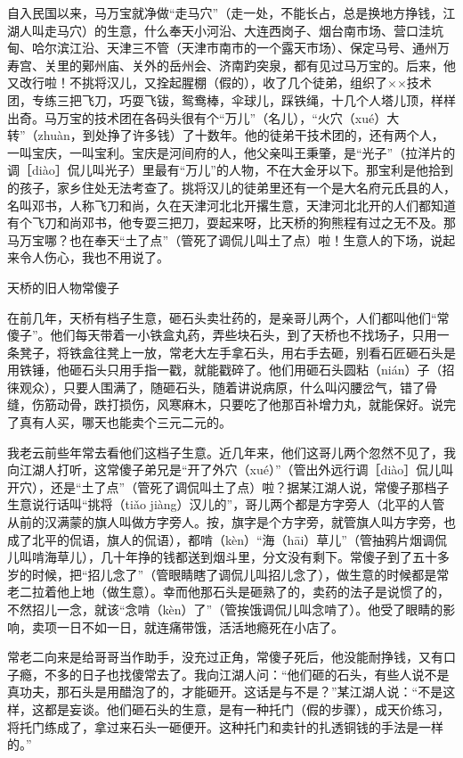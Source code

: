 \documentclass[12pt,UTF8]{ctexbook}
\begin{document}
自入民国以来，马万宝就净做“走马穴”（走一处，不能长占，总是换地方挣钱，江湖人叫走马穴）的生意，什么奉天小河沿、大连西岗子、烟台南市场、营口洼坑甸、哈尔滨江沿、天津三不管（天津市南市的一个露天市场）、保定马号、通州万寿宫、关里的鄚州庙、关外的岳州会、济南趵突泉，都有见过马万宝的。后来，他又改行啦！不挑将汉儿，又拴起腥棚（假的），收了几个徒弟，组织了××技术团，专练三把飞刀，巧耍飞钹，鸳鸯棒，伞球儿，踩铁绳，十几个人塔儿顶，样样出奇。马万宝的技术团在各码头很有个“万儿”（名儿），“火穴（xué）大转”（zhuàn，到处挣了许多钱）了十数年。他的徒弟干技术团的，还有两个人，一叫宝庆，一叫宝利。宝庆是河间府的人，他父亲叫王秉肇，是“光子”（拉洋片的调［diào］侃儿叫光子）里最有“万儿”的人物，不在大金牙以下。那宝利是他拾到的孩子，家乡住处无法考查了。挑将汉儿的徒弟里还有一个是大名府元氏县的人，名叫邓书，人称飞刀和尚，久在天津河北北开撂生意，天津河北北开的人们都知道有个飞刀和尚邓书，他专耍三把刀，耍起来呀，比天桥的狗熊程有过之无不及。那马万宝哪？也在奉天“土了点”（管死了调侃儿叫土了点）啦！生意人的下场，说起来令人伤心，我也不用说了。





天桥的旧人物常傻子


在前几年，天桥有档子生意，砸石头卖壮药的，是亲哥儿两个，人们都叫他们“常傻子”。他们每天带着一小铁盒丸药，弄些块石头，到了天桥也不找场子，只用一条凳子，将铁盒往凳上一放，常老大左手拿石头，用右手去砸，别看石匠砸石头是用铁锤，他砸石头只用手指一戳，就能戳碎了。他们用砸石头圆粘（nián）子（招徕观众），只要人围满了，随砸石头，随着讲说病原，什么叫闪腰岔气，错了骨缝，伤筋动骨，跌打损伤，风寒麻木，只要吃了他那百补增力丸，就能保好。说完了真有人买，哪天也能卖个三元二元的。

我老云前些年常去看他们这档子生意。近几年来，他们这哥儿两个忽然不见了，我向江湖人打听，这常傻子弟兄是“开了外穴（xué）”（管出外远行调［diào］侃儿叫开穴），还是“土了点”（管死了调侃叫土了点）啦？据某江湖人说，常傻子那档子生意说行话叫“挑将（tiǎo jiàng）汉儿的”，哥儿两个都是方字旁人（北平的人管从前的汉满蒙的旗人叫做方字旁人。按，旗字是个方字旁，就管旗人叫方字旁，也成了北平的侃语，旗人的侃语），都啃（kèn）“海（hāi）草儿”（管抽鸦片烟调侃儿叫啃海草儿），几十年挣的钱都送到烟斗里，分文没有剩下。常傻子到了五十多岁的时候，把“招儿念了”（管眼睛瞎了调侃儿叫招儿念了），做生意的时候都是常老二拉着他上地（做生意）。幸而他那石头是砸熟了的，卖药的法子是说惯了的，不然招儿一念，就该“念啃（kèn）了”（管挨饿调侃儿叫念啃了）。他受了眼睛的影响，卖项一日不如一日，就连痛带饿，活活地瘾死在小店了。

常老二向来是给哥哥当作助手，没充过正角，常傻子死后，他没能耐挣钱，又有口子瘾，不多的日子也找傻常去了。我向江湖人问：“他们砸的石头，有些人说不是真功夫，那石头是用醋泡了的，才能砸开。这话是与不是？”某江湖人说：“不是这样，这都是妄谈。他们砸石头的生意，是有一种托门（假的步骤），成天价练习，将托门练成了，拿过来石头一砸便开。这种托门和卖针的扎透铜钱的手法是一样的。”
\end{document}
